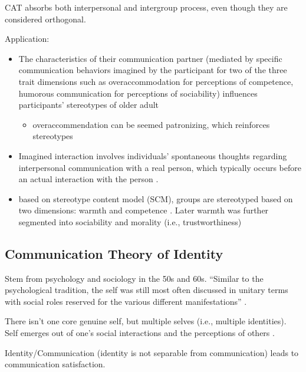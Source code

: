 \documentclass[
]{book}
\providecommand{\tightlist}{%
  \setlength{\itemsep}{0pt}\setlength{\parskip}{0pt}}
\begin{document}
CAT absorbs both interpersonal and intergroup process, even though they are considered orthogonal.

Application:

\citep{Chen_2016}

\begin{itemize}
\item
  The characteristics of their communication partner (mediated by specific communication behaviors imagined by the
  participant for two of the three trait dimensions such as overaccommodation for perceptions of competence, humorous
  communication for perceptions of sociability) influences participants' stereotypes of older adult

  \begin{itemize}
  \tightlist
  \item
    overaccommendation can be seemed patronizing, which reinforces stereotypes
  \end{itemize}
\item
  Imagined interaction involves individuals' spontaneous thoughts regarding interpersonal communication with a real
  person, which typically occurs before an actual interaction with the person \citep{Honeycutt_2014}.
\item
  based on stereotype content model (SCM), groups are stereotyped based on two dimensions: warmth and competence
  \citep{Fiske_2007}. Later warmth was further segmented into sociability and morality (i.e., trustworthiness)
\end{itemize}

\hypertarget{communication-theory-of-identity}{%
\subsection{Communication Theory of Identity}\label{communication-theory-of-identity}}

Stem from psychology and sociology in the 50s and 60s. ``Similar to the psychological tradition, the self was still most
often discussed in unitary terms with social roles reserved for the various different manifestations'' \citep[pp.
254]{Baxter_2008}.

There isn't one core genuine self, but multiple selves (i.e., multiple identities). Self emerges out of one's social
interactions and the perceptions of others \citep{stryker1979}.

Identity/Communication (identity is not separable from communication) leads to communication satisfaction.
\end{document}
